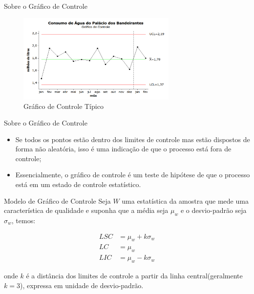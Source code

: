 \documentclass[12pt]{beamer}
\begin{document}
  \begin{frame}{Sobre o Gráfico de Controle}
    \begin{figure}[ht]
      \includegraphics[width=0.7\textwidth]{img/grafico_de_controle_tipico}
      \caption{Gráfico de Controle Típico}
    \end{figure}
  \end{frame}

  \begin{frame}[t]{Sobre o Gráfico de Controle}
    \begin{itemize}
      \item Se todos os pontos estão dentro dos limites de controle mas estão dispostos de forma não aleatória, isso é uma indicação de que o processo está fora de controle;

      \item Essencialmente, o gráfico de controle é um teste de hipótese de que o processo está em um estado de controle estatístico.
    \end{itemize}
  \end{frame}

  \begin{frame}[t]{Modelo de Gráfico de Controle}
    Seja $W$ uma estatística da amostra que mede uma característica de qualidade e suponha que a média seja $\mu_w$ e o desvio-padrão seja $\sigma_w$, temos:

    \begin{align*}
      LSC & =  \mu_{w} + k\sigma_{w} \\
      LC  & =  \mu_w \\
      LIC & =  \mu_w - k\sigma_w
    \end{align*}

    onde $k$ é a distância dos limites de controle a partir da linha central(geralmente $k = 3$), expressa em unidade de desvio-padrão.
  \end{frame}
\end{document}
